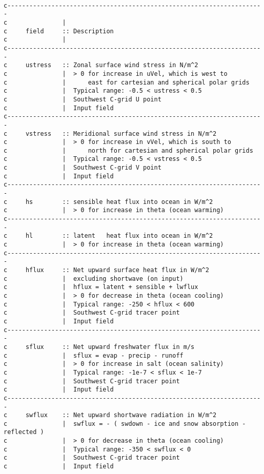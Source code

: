 {\footnotesize
\begin{verbatim}

c----------------------------------------------------------------------
c               |
c     field     :: Description
c               |
c----------------------------------------------------------------------
c     ustress   :: Zonal surface wind stress in N/m^2
c               |  > 0 for increase in uVel, which is west to
c               |      east for cartesian and spherical polar grids
c               |  Typical range: -0.5 < ustress < 0.5
c               |  Southwest C-grid U point
c               |  Input field
c----------------------------------------------------------------------
c     vstress   :: Meridional surface wind stress in N/m^2
c               |  > 0 for increase in vVel, which is south to
c               |      north for cartesian and spherical polar grids
c               |  Typical range: -0.5 < vstress < 0.5
c               |  Southwest C-grid V point
c               |  Input field
c----------------------------------------------------------------------
c     hs        :: sensible heat flux into ocean in W/m^2
c               |  > 0 for increase in theta (ocean warming)
c----------------------------------------------------------------------
c     hl        :: latent   heat flux into ocean in W/m^2
c               |  > 0 for increase in theta (ocean warming)
c----------------------------------------------------------------------
c     hflux     :: Net upward surface heat flux in W/m^2 
c               |  excluding shortwave (on input)
c               |  hflux = latent + sensible + lwflux
c               |  > 0 for decrease in theta (ocean cooling)
c               |  Typical range: -250 < hflux < 600
c               |  Southwest C-grid tracer point
c               |  Input field
c----------------------------------------------------------------------
c     sflux     :: Net upward freshwater flux in m/s
c               |  sflux = evap - precip - runoff
c               |  > 0 for increase in salt (ocean salinity)
c               |  Typical range: -1e-7 < sflux < 1e-7
c               |  Southwest C-grid tracer point
c               |  Input field
c----------------------------------------------------------------------
c     swflux    :: Net upward shortwave radiation in W/m^2
c               |  swflux = - ( swdown - ice and snow absorption - reflected )
c               |  > 0 for decrease in theta (ocean cooling)
c               |  Typical range: -350 < swflux < 0
c               |  Southwest C-grid tracer point
c               |  Input field

\end{verbatim}}
